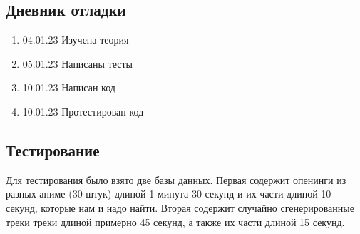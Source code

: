 \documentclass[12pt]{article}
\begin{document}
    \subsection*{Дневник отладки}

    \begin{enumerate}
        \item 04.01.23 Изучена теория
        \item 05.01.23 Написаны тесты
        \item 10.01.23 Написан код
        \item 10.01.23 Протестирован код
    \end{enumerate}


    \subsection*{Тестирование}

    Для тестирования было взято две базы данных. Первая содержит опенинги из разных аниме (30 штук) длиной 1 минута 30 секунд и их части длиной 10 секунд, которые нам и надо найти. Вторая содержит случайно сгенерированные треки треки длиной примерно 45 секунд, а также их части длиной 15 секунд.
\end{document}
